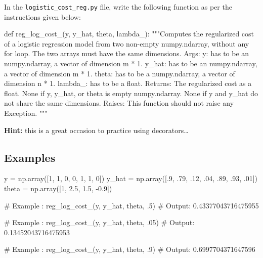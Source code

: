 \documentclass[]{article}
\newenvironment{Shaded}{\begin{snugshade}}{\end{snugshade}}
\newcommand{\CommentTok}[1]{\textcolor[rgb]{0.48,0.49,0.49}{#1}}
\newcommand{\DecValTok}[1]{\textcolor[rgb]{0.96,0.45,0.00}{#1}}
\newcommand{\FloatTok}[1]{\textcolor[rgb]{0.96,0.45,0.00}{#1}}
\newcommand{\KeywordTok}[1]{\textcolor[rgb]{0.81,0.81,0.76}{#1}}
\newcommand{\NormalTok}[1]{\textcolor[rgb]{0.81,0.81,0.76}{#1}}
\newcommand{\OperatorTok}[1]{\textcolor[rgb]{0.81,0.81,0.76}{#1}}
\begin{document}
In the \texttt{logistic\_cost\_reg.py} file, write the following
function as per the instructions given below:

\begin{Shaded}
\begin{Highlighting}[]
\KeywordTok{def}\NormalTok{ reg_log_cost_(y, y_hat, theta, lambda_):}
    \CommentTok{"""Computes the regularized cost of a logistic regression model from two non-empty numpy.ndarray, without any for loop. The two arrays must have the same dimensions.}
\CommentTok{    Args:}
\CommentTok{      y: has to be an numpy.ndarray, a vector of dimension m * 1.}
\CommentTok{      y_hat: has to be an numpy.ndarray, a vector of dimension m * 1.}
\CommentTok{      theta: has to be a numpy.ndarray, a vector of dimension n * 1.}
\CommentTok{      lambda_: has to be a float.}
\CommentTok{    Returns:}
\CommentTok{      The regularized cost as a float.}
\CommentTok{      None if y, y_hat, or theta is empty numpy.ndarray.}
\CommentTok{      None if y and y_hat do not share the same dimensions.}
\CommentTok{    Raises:}
\CommentTok{      This function should not raise any Exception.}
\CommentTok{    """}
\end{Highlighting}
\end{Shaded}

\textbf{Hint:} this is a great occasion to practice using
decorators\ldots{}

\hypertarget{examples-5}{%
\subsection{Examples}\label{examples-5}}

\begin{Shaded}
\begin{Highlighting}[]
\NormalTok{y }\OperatorTok{=}\NormalTok{ np.array([}\DecValTok{1}\NormalTok{, }\DecValTok{1}\NormalTok{, }\DecValTok{0}\NormalTok{, }\DecValTok{0}\NormalTok{, }\DecValTok{1}\NormalTok{, }\DecValTok{1}\NormalTok{, }\DecValTok{0}\NormalTok{])}
\NormalTok{y_hat }\OperatorTok{=}\NormalTok{ np.array([.}\DecValTok{9}\NormalTok{, }\FloatTok{.79}\NormalTok{, }\FloatTok{.12}\NormalTok{, }\FloatTok{.04}\NormalTok{, }\FloatTok{.89}\NormalTok{, }\FloatTok{.93}\NormalTok{, }\FloatTok{.01}\NormalTok{])}
\NormalTok{theta }\OperatorTok{=}\NormalTok{ np.array([}\DecValTok{1}\NormalTok{, }\FloatTok{2.5}\NormalTok{, }\FloatTok{1.5}\NormalTok{, }\FloatTok{-0.9}\NormalTok{])}

\CommentTok{# Example :}
\NormalTok{reg_log_cost_(y, y_hat, theta, }\FloatTok{.5}\NormalTok{)}
\CommentTok{# Output:}
\FloatTok{0.43377043716475955}

\CommentTok{# Example :}
\NormalTok{reg_log_cost_(y, y_hat, theta, }\FloatTok{.05}\NormalTok{)}
\CommentTok{# Output:}
\FloatTok{0.13452043716475953}

\CommentTok{# Example :}
\NormalTok{reg_log_cost_(y, y_hat, theta, }\FloatTok{.9}\NormalTok{)}
\CommentTok{# Output:}
\FloatTok{0.6997704371647596}
\end{Highlighting}
\end{Shaded}
\end{document}
